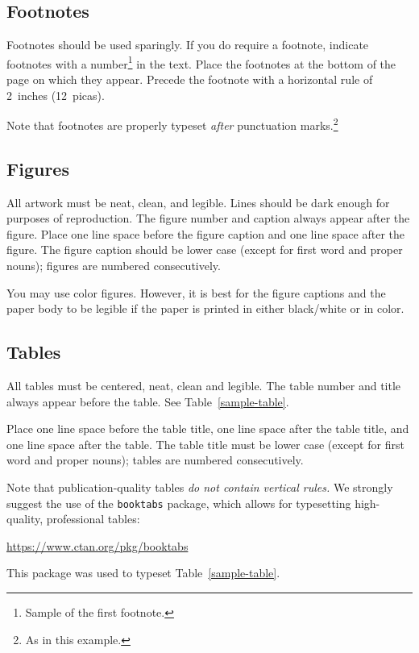 \documentclass{article}
\begin{document}
\subsection{Footnotes}


Footnotes should be used sparingly.  If you do require a footnote, indicate
footnotes with a number\footnote{Sample of the first footnote.} in the
text. Place the footnotes at the bottom of the page on which they appear.
Precede the footnote with a horizontal rule of 2~inches (12~picas).


Note that footnotes are properly typeset \emph{after} punctuation
marks.\footnote{As in this example.}


\subsection{Figures}

All artwork must be neat, clean, and legible. Lines should be dark enough for
purposes of reproduction. The figure number and caption always appear after the
figure. Place one line space before the figure caption and one line space after
the figure. The figure caption should be lower case (except for first word and
proper nouns); figures are numbered consecutively.


You may use color figures.  However, it is best for the figure captions and the
paper body to be legible if the paper is printed in either black/white or in
color.


\subsection{Tables}


All tables must be centered, neat, clean and legible.  The table number and
title always appear before the table.  See Table~\ref{sample-table}.


Place one line space before the table title, one line space after the
table title, and one line space after the table. The table title must
be lower case (except for first word and proper nouns); tables are
numbered consecutively.


Note that publication-quality tables \emph{do not contain vertical rules.} We
strongly suggest the use of the \verb+booktabs+ package, which allows for
typesetting high-quality, professional tables:
\begin{center}
  \url{https://www.ctan.org/pkg/booktabs}
\end{center}
This package was used to typeset Table~\ref{sample-table}.
\end{document}
